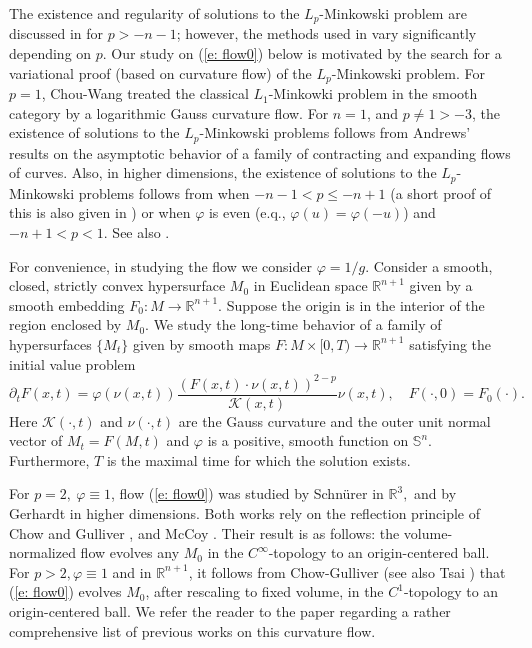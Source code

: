 \documentclass{amsart}
\theoremstyle{definition}
\theoremstyle{remark}
\numberwithin{equation}{section}
\begin{document}
The existence and regularity of solutions to the $L_p$-Minkowski problem are discussed in \cite{39} for $p > −n-1$; however, the methods used in \cite{39} vary significantly depending on $p$. Our study on (\ref{e: flow0}) below is motivated by the search for a variational proof (based on curvature flow) of the $L_p$-Minkowski problem. For $p=1$, Chou-Wang \cite{Chou Wang 2000} treated the classical $L_1$-Minkowki problem in the smooth category by a logarithmic Gauss curvature flow.   For $n=1$, and $p\neq 1>-3$, the existence of solutions to the $L_p$-Minkowski problems follows from Andrews' results \cite{Andrews 1998} on the asymptotic behavior of a family of contracting and expanding flows of curves. Also, in higher dimensions, the existence of solutions to the $L_p$-Minkowski problems follows from \cite{Andrews Ben 2000} when $-n-1<p\leq -n+1$ (a short proof of this is also given in \cite{Ivaki-Proc}) or when $\varphi$ is even (e.q., $\varphi(u)=\varphi(-u)$) and $-n+1<p<1.$ See also \cite{Andrews 1999,AGN, GN, U1, U2}.


For convenience, in studying the flow we consider $\varphi = 1/g$. Consider a smooth, closed, strictly convex hypersurface $M_0$ in Euclidean space $\mathbb{R}^{n+1}$ given by a smooth embedding $F_0:M\to \mathbb{R}^{n+1}.$ Suppose the origin is in the interior of the region enclosed by $M_0.$ We study the long-time behavior of a family of hypersurfaces $\{M_t\}$ given by smooth maps $F:M\times [0,T)\to \mathbb{R}^{n+1}$ satisfying the initial value problem
\begin{equation}\label{e: flow0}
 \partial_{t}F(x,t)=\varphi(\nu(x,t))\frac{(F(x,t)\cdot \nu (x,t))^{2-p}}{\mathcal{K}(x,t)} \nu(x,t),\quad
 F(\cdot,0)=F_{0}(\cdot).
\end{equation}
Here $\mathcal{K}(\cdot,t)$ and $\nu(\cdot,t)$ are the Gauss curvature and the outer unit normal vector of $M_t=F(M,t)$ and $\varphi$ is a positive, smooth function on $\mathbb{S}^{n}$. Furthermore, $T$ is the maximal time for which the solution exists.


For $p=2,~\varphi\equiv1$, flow (\ref{e: flow0}) was studied by Schn\"{u}rer \cite{Oliver 2006} in $\mathbb{R}^3,$ and by Gerhardt \cite{Gerhardt 2014} in higher dimensions. Both works rely on the reflection principle of Chow and Gulliver \cite{Bennett Chow and Robert Gulliver 1996}, and McCoy \cite{James A. McCoy 2003}. Their result is as follows: the volume-normalized flow evolves any $M_0$ in the $C^{\infty}$-topology to an origin-centered ball. For $p>2, \varphi\equiv1$ and in $\mathbb{R}^{n+1}$, it follows from Chow-Gulliver \cite[Theorem 3.1]{Bennett Chow and Robert Gulliver 1996} (see also Tsai \cite[Example 1]{Tsai 2005}) that (\ref{e: flow0}) evolves $M_0$, after rescaling to fixed volume, in the $C^{1}$-topology to an origin-centered ball. We refer the reader to the paper \cite{Ivaki 2014-gauss} regarding a rather comprehensive list of previous works on this curvature flow.
\end{document}

